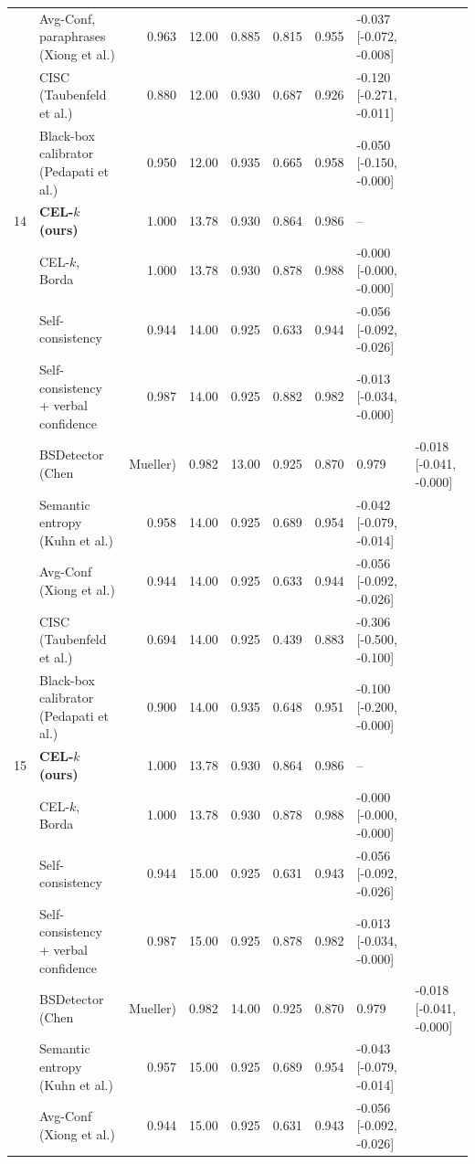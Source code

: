 \begin{table}[t]
\begin{tabular}{llrrrrrl}
 & Avg-Conf, paraphrases (Xiong et al.) & 0.963 & 12.00 & 0.885 & 0.815 & 0.955 & -0.037 [-0.072, -0.008] \\
 & CISC (Taubenfeld et al.) & 0.880 & 12.00 & 0.930 & 0.687 & 0.926 & -0.120 [-0.271, -0.011] \\
 & Black-box calibrator (Pedapati et al.) & 0.950 & 12.00 & 0.935 & 0.665 & 0.958 & -0.050 [-0.150, -0.000] \\
14 & \textbf{CEL-$k$ (ours)} & 1.000 & 13.78 & 0.930 & 0.864 & 0.986 & -- \\
 & \quad CEL-$k$, Borda & 1.000 & 13.78 & 0.930 & 0.878 & 0.988 & -0.000 [-0.000, -0.000] \\
 & Self-consistency & 0.944 & 14.00 & 0.925 & 0.633 & 0.944 & -0.056 [-0.092, -0.026] \\
 & Self-consistency + verbal confidence & 0.987 & 14.00 & 0.925 & 0.882 & 0.982 & -0.013 [-0.034, -0.000] \\
 & BSDetector (Chen & Mueller) & 0.982 & 13.00 & 0.925 & 0.870 & 0.979 & -0.018 [-0.041, -0.000] \\
 & Semantic entropy (Kuhn et al.) & 0.958 & 14.00 & 0.925 & 0.689 & 0.954 & -0.042 [-0.079, -0.014] \\
 & Avg-Conf (Xiong et al.) & 0.944 & 14.00 & 0.925 & 0.633 & 0.944 & -0.056 [-0.092, -0.026] \\
 & CISC (Taubenfeld et al.) & 0.694 & 14.00 & 0.925 & 0.439 & 0.883 & -0.306 [-0.500, -0.100] \\
 & Black-box calibrator (Pedapati et al.) & 0.900 & 14.00 & 0.935 & 0.648 & 0.951 & -0.100 [-0.200, -0.000] \\
15 & \textbf{CEL-$k$ (ours)} & 1.000 & 13.78 & 0.930 & 0.864 & 0.986 & -- \\
 & \quad CEL-$k$, Borda & 1.000 & 13.78 & 0.930 & 0.878 & 0.988 & -0.000 [-0.000, -0.000] \\
 & Self-consistency & 0.944 & 15.00 & 0.925 & 0.631 & 0.943 & -0.056 [-0.092, -0.026] \\
 & Self-consistency + verbal confidence & 0.987 & 15.00 & 0.925 & 0.878 & 0.982 & -0.013 [-0.034, -0.000] \\
 & BSDetector (Chen & Mueller) & 0.982 & 14.00 & 0.925 & 0.870 & 0.979 & -0.018 [-0.041, -0.000] \\
 & Semantic entropy (Kuhn et al.) & 0.957 & 15.00 & 0.925 & 0.689 & 0.954 & -0.043 [-0.079, -0.014] \\
 & Avg-Conf (Xiong et al.) & 0.944 & 15.00 & 0.925 & 0.631 & 0.943 & -0.056 [-0.092, -0.026] \\

\end{tabular}
\end{table}
